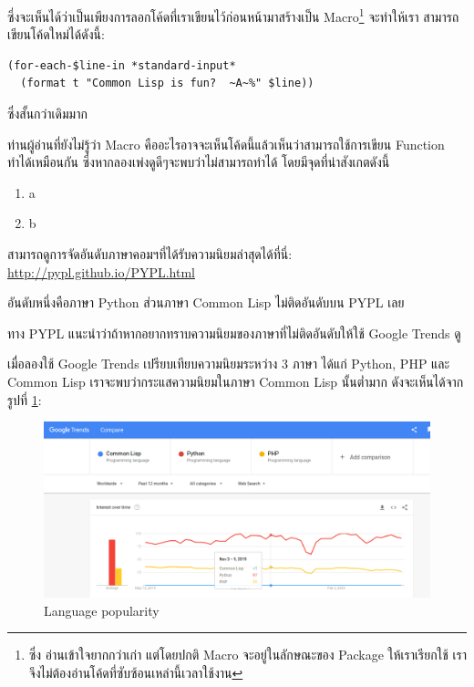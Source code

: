 \documentclass[a4paper]{article}
\begin{document}
ซึ่งจะเห็นได้ว่าเป็นเพียงการลอกโค้ดที่เราเขียนไว้ก่อนหน้ามาสร้างเป็น Macro\footnote{ซึ่ง%
อ่านเข้าใจยากกว่าเก่า แต่โดยปกติ Macro จะอยู่ในลักษณะของ Package ให้เราเรียกใช้
เราจึงไม่ต้องอ่านโค้ดที่ซับซ้อนเหล่านี้เวลาใช้งาน} จะทำให้เรา%
สามารถเขียนโค้ดใหม่ได้ดังนี้:

\lstset{language=Lisp}
\begin{lstlisting}
(for-each-$line-in *standard-input*
  (format t "Common Lisp is fun?  ~A~%" $line))
\end{lstlisting}

ซึ่งสั้นกว่าเดิมมาก

ท่านผู้อ่านที่ยังไม่รู้ว่า Macro คืออะไรอาจจะเห็นโค้ดนี้แล้วเห็นว่าสามารถใช้การเขียน Function 
ทำได้เหมือนกัน ซึ่งหากลองเพ่งดูดีๆจะพบว่าไม่สามารถทำได้ โดยมีจุดที่น่าสังเกตดังนี้

\begin{enumerate}
  \item a
  \item b
\end{enumerate}

สามารถดูการจัดอันดับภาษาคอมฯที่ได้รับความนิยมล่าสุดได้ที่นี่: \href{http://pypl.github.io/PYPL.html}{http://pypl.github.io/PYPL.html}

อันดับหนึ่งคือภาษา Python ส่วนภาษา Common Lisp ไม่ติดอันดับบน PYPL เลย

ทาง PYPL แนะนำว่าถ้าหากอยากทราบความนิยมของภาษาที่ไม่ติดอันดับให้ใช้ Google Trends ดู

เมื่อลองใช้ Google Trends เปรียบเทียบความนิยมระหว่าง 3 ภาษา ได้แก่ Python, PHP
และ Common Lisp เราจะพบว่ากระแสความนิยมในภาษา Common Lisp นั้นต่ำมาก
ดังจะเห็นได้จากรูปที่ \ref{lang-pop}:

\begin{figure}[!hbtp]
  \includegraphics[width=\linewidth]{images/lang-popularity.png}
  \caption{Language popularity\label{lang-pop}}
\end{figure}
\end{document}
